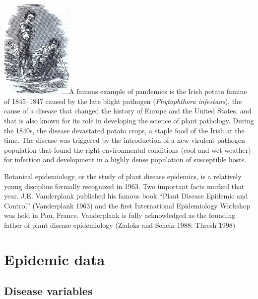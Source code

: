 \documentclass[
  letterpaper,
  DIV=11,
  numbers=noendperiod]{scrreprt}
\begin{document}
\begin{tcolorbox}[enhanced jigsaw, colbacktitle=quarto-callout-note-color!10!white, toprule=.15mm, leftrule=.75mm, bottomrule=.15mm, opacitybacktitle=0.6, coltitle=black, rightrule=.15mm, left=2mm, breakable, colframe=quarto-callout-note-color-frame, title=\textcolor{quarto-callout-note-color}{\faInfo}\hspace{0.5em}{Note}, bottomtitle=1mm, toptitle=1mm, titlerule=0mm, colback=white, arc=.35mm, opacityback=0]
\href{https://en.wikipedia.org/wiki/Great_Famine_(Ireland)}{\includegraphics[width=1.36458in,height=\textheight]{./imgs/intro_famine.JPG}}A
famous example of pandemics is the Irish potato famine of 1845--1847
caused by the late blight pathogen (\emph{Phytophthora infestans}), the
cause of a disease that changed the history of Europe and the United
States, and that is also known for its role in developing the science of
plant pathology. During the 1840s, the disease devastated potato crops,
a staple food of the Irish at the time. The disease was triggered by the
introduction of a new virulent pathogen population that found the right
environmental conditions (cool and wet weather) for infection and
development in a highly dense population of susceptible hosts.
\end{tcolorbox}

Botanical epidemiology, or the study of plant disease epidemics, is a
relatively young discipline formally recognized in 1963. Two important
facts marked that year. J.E. Vanderplank published his famous book
``Plant Disease Epidemic and Control'' (Vanderplank 1963) and the first
International Epidemiology Workshop was held in Pau, France. Vanderplank
is fully acknowledged as the founding father of plant disease
epidemiology (Zadoks and Schein 1988; Thresh 1998)

\part{Epidemic data}

\hypertarget{disease-variables}{%
\chapter{Disease variables}\label{disease-variables}}
\end{document}
